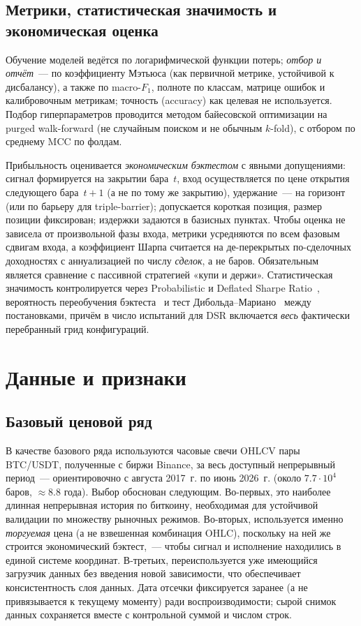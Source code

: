 \documentclass[12pt,a4paper]{report}
\begin{document}
\section{Метрики, статистическая значимость и экономическая оценка}

Обучение моделей ведётся по логарифмической функции потерь; \emph{отбор и отчёт}~---
по коэффициенту Мэтьюса (как первичной метрике, устойчивой к дисбалансу), а также
по macro-$F_1$, полноте по классам, матрице ошибок и калибровочным метрикам;
точность (accuracy) как целевая не используется. Подбор гиперпараметров проводится
методом байесовской оптимизации на purged walk-forward (не случайным поиском и не
обычным $k$-fold), с отбором по среднему MCC по фолдам.

Прибыльность оценивается \emph{экономическим бэктестом} с явными допущениями: сигнал
формируется на закрытии бара~$t$, вход осуществляется по цене открытия следующего
бара~$t{+}1$ (а не по тому же закрытию), удержание~--- на горизонт (или по барьеру
для triple-barrier); допускается короткая позиция, размер позиции фиксирован;
издержки задаются в базисных пунктах. Чтобы оценка не зависела от произвольной фазы
входа, метрики усредняются по всем фазовым сдвигам входа, а коэффициент Шарпа
считается на де-перекрытых по-сделочных доходностях с аннуализацией по числу
\emph{сделок}, а не баров. Обязательным является сравнение с пассивной стратегией
«купи и держи». Статистическая значимость контролируется через Probabilistic и
Deflated Sharpe Ratio~\cite{bailey2014}, вероятность переобучения
бэктеста~\cite{bailey2017} и тест Дибольда--Мариано~\cite{diebold1995} между
постановками, причём в число испытаний для DSR включается \emph{весь} фактически
перебранный грид конфигураций.

\chapter{Данные и признаки}
\label{ch:data}

\section{Базовый ценовой ряд}

В качестве базового ряда используются часовые свечи OHLCV пары BTC/USDT, полученные
с биржи Binance, за весь доступный непрерывный период~--- ориентировочно с августа
2017~г. по июнь 2026~г. (около $7.7\cdot 10^{4}$ баров, $\approx 8.8$ года). Выбор
обоснован следующим. Во-первых, это наиболее длинная непрерывная история по
биткоину, необходимая для устойчивой валидации по множеству рыночных режимов.
Во-вторых, используется именно \emph{торгуемая} цена (а не взвешенная комбинация
OHLC), поскольку на ней же строится экономический бэктест,~--- чтобы сигнал и
исполнение находились в единой системе координат. В-третьих, переиспользуется уже
имеющийся загрузчик данных без введения новой зависимости, что обеспечивает
консистентность слоя данных. Дата отсечки фиксируется заранее (а не привязывается к
текущему моменту) ради воспроизводимости; сырой снимок данных сохраняется вместе с
контрольной суммой и числом строк.
\end{document}
